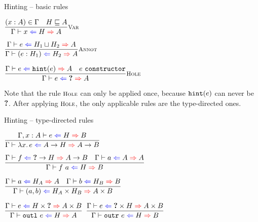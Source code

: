 \documentclass{beamer}
\begin{document}
\begin{frame}{Hinting -- basic rules}

\begin{center}
  $\infrule[Var]{\sidecond{(x : A) \in \Gamma} \quad \sidecond{\hintorder{H}{A}}}{\hinting{x}{H}{A}}$

  \vspace{2em}

  $\infrule[Annot]{\hinting{e}{\combinehints{H_1}{H_2}}{A}}{\hinting{\annot{e}{H_1}}{H_2}{A}}$

  \vspace{2em}

  $\infrule[Hole]{\hinting{e}{\hintfor{e}}{A} \quad \sidecond{e\ \texttt{constructor}}}{\hinting{e}{\Hole}{A}}$
\end{center}

\vspace{2em}

Note that the rule $\textsc{\footnotesize{Hole}}$ can only be applied once, because $\texttt{hint}(e)$ can never be $\textbf{?}$. After applying $\textsc{\footnotesize{Hole}}$, the only applicable rules are the type-directed ones.

\end{frame}

\begin{frame}{Hinting -- type-directed rules}

\begin{center}
  $\infrule{\fullhinting{\extend{\Gamma}{x}{A}}{e}{H}{B}}{\hinting{\fun{x}{e}}{\Fun{A}{H}}{\Fun{A}{B}}}$

  \vspace{2em}

  $\infrule{\hinting{f}{\Fun{\Hole}{H}}{\Fun{A}{B}} \quad \hinting{a}{A}{A}}{\hinting{\app{f}{a}}{H}{B}}$

  \vspace{2em}

  $\infrule{\hinting{a}{H_A}{A} \quad \hinting{b}{H_B}{B}}{\hinting{\pair{a}{b}}{\Prod{H_A}{H_B}}{\Prod{A}{B}}}$

  \vspace{2em}

  $\infrule{\hinting{e}{\Prod{H}{\Hole}}{\Prod{A}{B}}}{\hinting{\outl{e}}{H}{A}}$ \quad
  $\infrule{\hinting{e}{\Prod{\Hole}{H}}{\Prod{A}{B}}}{\hinting{\outr{e}}{H}{B}}$
\end{center}

\end{frame}
\end{document}
